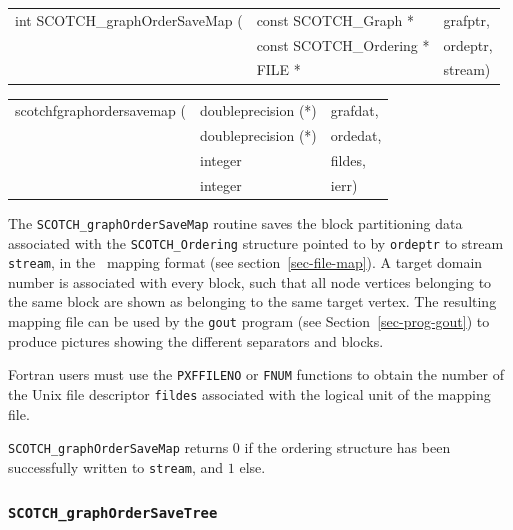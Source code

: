 \begin{itemize}
\progsyn

{\tt\begin{tabular}{l@{}ll}
int SCOTCH\_graphOrderSaveMap ( & const SCOTCH\_Graph *    & grafptr, \\
                                & const SCOTCH\_Ordering * & ordeptr, \\
                                & FILE *                   & stream)
\end{tabular}}

{\tt\begin{tabular}{l@{}ll}
scotchfgraphordersavemap ( & doubleprecision (*) & grafdat, \\
                           & doubleprecision (*) & ordedat, \\
                           & integer             & fildes,  \\
                           & integer             & ierr)
\end{tabular}}

\progdes

The {\tt SCOTCH\_graphOrderSaveMap} routine saves the block
partitioning data associated with the {\tt SCOTCH\_\lbt Ordering}
structure pointed to by {\tt ordeptr} to stream {\tt stream},
in the \scotch\ mapping format (see section~\ref{sec-file-map}).
A target domain number is associated with every block, such that
all node vertices belonging to the same block are shown as belonging
to the same target vertex.
The resulting mapping file can be used by the {\tt gout} program
(see Section~\ref{sec-prog-gout}) to produce pictures showing
the different separators and blocks.

Fortran users must use the {\tt PXFFILENO} or {\tt FNUM} functions to
obtain the number of the Unix file descriptor {\tt fildes} associated
with the logical unit of the mapping file.

\progret

{\tt SCOTCH\_graphOrderSaveMap} returns $0$ if the ordering structure
has been successfully written to {\tt stream}, and $1$ else.
\end{itemize}

\subsubsection{{\tt SCOTCH\_graphOrderSaveTree}}

